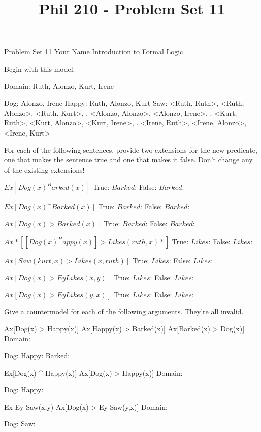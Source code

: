 
\title{Phil 210 - Problem Set 11}

\heading
Problem Set 11
Your Name
Introduction to Formal Logic
\endheading

Begin with this model:

\answer
	\firstordermodel 
	Domain: Ruth, Alonzo, Kurt, Irene

	Dog:    Alonzo, Irene
	Happy:  Ruth, Alonzo, Kurt
	Saw:    <Ruth, Ruth>, <Ruth, Alonzo>, <Ruth, Kurt>,
	   .    <Alonzo, Alonzo>, <Alonzo, Irene>,
	   .    <Kurt, Ruth>, <Kurt, Alonzo>, <Kurt, Irene>,
	   .    <Irene, Ruth>, <Irene, Alonzo>, <Irene, Kurt>
	\endfirstordermodel
\endanswer\bigskip

For each of the following sentences, provide two extensions for the new predicate, one that makes the sentence true and one that makes it false. Don't change any of the existing extensions!

\problems
{}
$ Ex[Dog(x) ^ Barked(x)] $
	\answer
	True: $Barked$: 
	False: $Barked$: 
	\endanswer

$ Ex[Dog(x) ^ -Barked(x)] $
	\answer
	True: $Barked$: 
	False: $Barked$: 
	\endanswer

$ Ax[Dog(x) > Barked(x)] $
	\answer
	True: $Barked$: 
	False: $Barked$: 
	\endanswer

$ Ax*[[Dog(x) ^ Happy(x)] > Likes(ruth,x)*] $
	\answer
	True: $Likes$: 
	False: $Likes$: 
	\endanswer

$ Ax[Saw(kurt,x) > Likes(x,ruth)] $
	\answer
	True: $Likes$: 
	False: $Likes$: 
	\endanswer

$ Ax[Dog(x) > Ey Likes(x,y)] $
	\answer
	True: $Likes$: 
	False: $Likes$: 
	\endanswer

$ Ax[Dog(x) > Ey Likes(y,x)] $
	\answer
	True: $Likes$: 
	False: $Likes$: 
	\endanswer

\endproblems

Give a countermodel for each of the following arguments. They're all invalid.

\problems
{}
\argument
 Ax[Dog(x) > Happy(x)]
 Ax[Happy(x) > Barked(x)]
\argumentline
 Ax[Barked(x) > Dog(x)]
\endargument
	\answer
	\firstordermodel
	Domain: 

	Dog:    
	Happy:  
	Barked: 
	\endfirstordermodel
	\endanswer

\argument
 Ex[Dog(x) ^ Happy(x)]
\argumentline
 Ax[Dog(x) > Happy(x)]
\endargument
	\answer
	\firstordermodel
	Domain: 

	Dog:    
	Happy:  
	\endfirstordermodel
	\endanswer

\argument
 Ex Ey Saw(x,y)
\argumentline
 Ax[Dog(x) > Ey Saw(y,x)]
\endargument
	\answer
	\firstordermodel
	Domain: 

	Dog:    
	Saw:    
	\endfirstordermodel
	\endanswer

\endproblems
\bye
